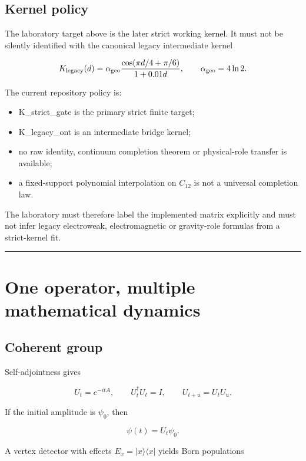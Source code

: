 \documentclass[11pt,a4paper,openany]{report}
\begin{document}
\section{Kernel policy}

The laboratory target above is the later strict working kernel. It must not be silently identified with the canonical legacy intermediate kernel

\[
K_{\rm legacy}(d)
=
\alpha_{\rm geo}
\frac{\cos(\pi d/4+\pi/6)}{1+0.01d},
\qquad
\alpha_{\rm geo}=4\ln2.
\]

The current repository policy is:

\begin{itemize}
\item 
K\_strict\_gate is the primary strict finite target;

\item 
K\_legacy\_ont is an intermediate bridge kernel;

\item 
no raw identity, continuum completion theorem or physical-role transfer is available;

\item 
a fixed-support polynomial interpolation on \(C_{12}\) is not a universal completion law.

\end{itemize}

The laboratory must therefore label the implemented matrix explicitly and must not infer legacy electroweak, electromagnetic or gravity-role formulas from a strict-kernel fit.

\par\medskip\hrule\medskip

\chapter{One operator, multiple mathematical dynamics}

\section{Coherent group}

Self-adjointness gives

\[
U_t=e^{-itA},
\qquad
U_t^\dagger U_t=I,
\qquad
U_{t+u}=U_tU_u.
\]

If the initial amplitude is \(\psi_0\), then

\[
\psi(t)=U_t\psi_0.
\]

A vertex detector with effects \(E_x=|x\rangle\langle x|\) yields Born populations
\end{document}
